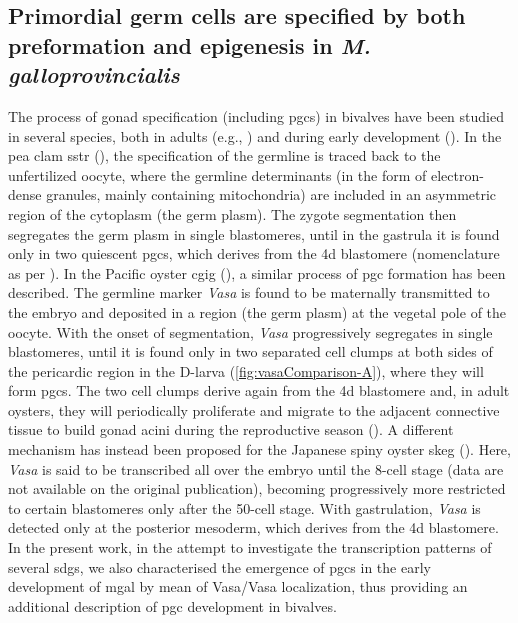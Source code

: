 \subsection{Primordial germ cells are specified by both preformation and epigenesis in \textit{M. galloprovincialis}}\label{chapter:insitu-discussionVasa}
The process of gonad specification (including \glspl{pgc}) in bivalves have been studied in several species, both in adults (e.g., ) and during early development (). In the pea clam \gls{sstr} (), the specification of the germline is traced back to the unfertilized oocyte, where the germline determinants (in the form of electron-dense granules, mainly containing mitochondria) are included in an asymmetric region of the cytoplasm (the germ plasm). The zygote segmentation then segregates the germ plasm in single blastomeres, until in the gastrula it is found only in two quiescent \glspl{pgc}, which derives from the 4d blastomere (nomenclature as per ). In the Pacific oyster \gls{cgig} (), a similar process of \gls{pgc} formation has been described. The germline marker \textit{Vasa} is found to be maternally transmitted to the embryo and deposited in a region (the germ plasm) at the vegetal pole of the oocyte. With the onset of segmentation, \textit{Vasa} progressively segregates in single blastomeres, until it is found only in two separated cell clumps at both sides of the pericardic region in the D-larva (\cref{fig:vasaComparison-A}), where they will form \glspl{pgc}. The two cell clumps derive again from the 4d blastomere and, in adult oysters, they will periodically proliferate and migrate to the adjacent connective tissue to build gonad acini during the reproductive season (). A different mechanism has instead been proposed for the Japanese spiny oyster \gls{skeg} (). Here, \textit{Vasa} is said to be transcribed all over the embryo until the 8-cell stage (data are not available on the original publication), becoming progressively more restricted to certain blastomeres only after the 50-cell stage. With gastrulation, \textit{Vasa} is detected only at the posterior mesoderm, which derives from the 4d blastomere. In the present work, in the attempt to investigate the transcription patterns of several \glspl{sdg}, we also characterised the emergence of \glspl{pgc} in the early development of \gls{mgal} by mean of Vasa/Vasa localization, thus providing an additional description of \gls{pgc} development in bivalves.

